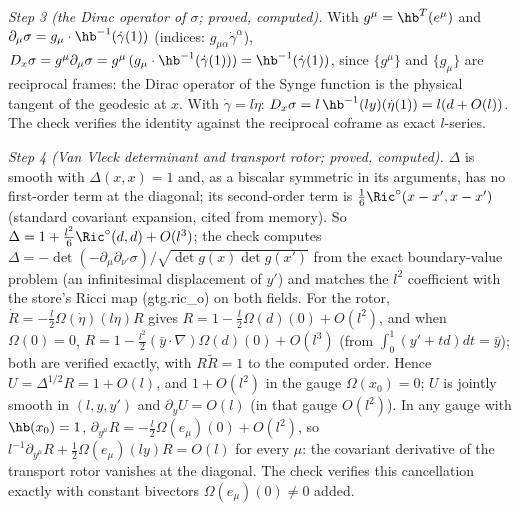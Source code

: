 \emph{Step 3 (the Dirac operator of $\sigma$; proved, computed).} With $g^{\mu} = \hb^{T}(e^{\mu})$ and $\partial_{\mu}\sigma = g_{\mu}\cdot\hb^{-1}(\dot\gamma(1))$ (indices: $g_{\mu\alpha}\dot\gamma^{\alpha}$), $D_{x}\sigma = g^{\mu}\partial_{\mu}\sigma = g^{\mu}\,(g_{\mu}\cdot\hb^{-1}(\dot\gamma(1))) = \hb^{-1}(\dot\gamma(1))$, since $\{g^{\mu}\}$ and $\{g_{\mu}\}$ are reciprocal frames: the Dirac operator of the Synge function is the physical tangent of the geodesic at $x$. With $\dot\gamma = l\dot\eta$: $D_{x}\sigma = l\,\hb^{-1}(ly)(\dot\eta(1)) = l(d + O(l))$. The check verifies the identity against the reciprocal coframe as exact $l$-series.

\emph{Step 4 (Van Vleck determinant and transport rotor; proved, computed).} $\Delta$ is smooth with $\Delta(x, x) = 1$ and, as a biscalar symmetric in its arguments, has no first-order term at the diagonal; its second-order term is $\tfrac16\Ric^{\circ}(x - x', x - x')$ (standard covariant expansion, cited from memory). So $\Delta = 1 + \tfrac{l^{2}}{6}\Ric^{\circ}(d, d) + O(l^{3})$; the check computes $\Delta = -\det(-\partial_{\mu}\partial_{\nu'}\sigma)/\sqrt{\det g(x)\det g(x')}$ from the exact boundary-value problem (an infinitesimal displacement of $y'$) and matches the $l^{2}$ coefficient with the store's Ricci map (gtg.ric\_o) on both fields. For the rotor, $\dot R = -\tfrac{l}{2}\Omega(\dot\eta)(l\eta)R$ gives $R = 1 - \tfrac{l}{2}\Omega(d)(0) + O(l^{2})$, and when $\Omega(0) = 0$, $R = 1 - \tfrac{l^{2}}{2}(\bar y\cdot\nabla)\Omega(d)(0) + O(l^{3})$ (from $\int_{0}^{1}(y' + td)dt = \bar y$); both are verified exactly, with $R\tilde R = 1$ to the computed order. Hence $U = \Delta^{1/2}R = 1 + O(l)$, and $1 + O(l^{2})$ in the gauge $\Omega(x_{0}) = 0$; $U$ is jointly smooth in $(l, y, y')$ and $\partial_{y}U = O(l)$ (in that gauge $O(l^{2})$). In any gauge with $\hb(x_{0}) = 1$, $\partial_{y^{\mu}}R = -\tfrac{l}{2}\Omega(e_{\mu})(0) + O(l^{2})$, so $l^{-1}\partial_{y^{\mu}}R + \tfrac12\Omega(e_{\mu})(ly)R = O(l)$ for every $\mu$: the covariant derivative of the transport rotor vanishes at the diagonal. The check verifies this cancellation exactly with constant bivectors $\Omega(e_{\mu})(0) \ne 0$ added.

